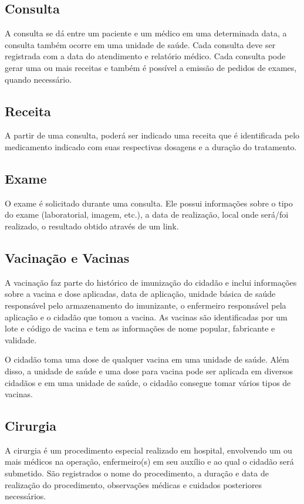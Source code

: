\documentclass[12pt, a4paper]{article}
\begin{document}
\subsection*{Consulta}
    A consulta se dá entre um paciente e um médico em uma determinada data, a
    consulta também ocorre em uma unidade de saúde. Cada consulta deve ser registrada
    com a data do atendimento e relatório médico. Cada consulta pode gerar uma ou mais
    receitas e também é possível a emissão de pedidos de exames, quando necessário.

\subsection*{Receita}
    A partir de uma consulta, poderá ser indicado uma receita que é identificada pelo
    medicamento indicado com suas respectivas dosagens e a duração do tratamento.

\subsection*{Exame}
    O exame é solicitado durante uma consulta. Ele possui informações sobre o tipo
    do exame (laboratorial, imagem, etc.), a data de realização, local onde será/foi realizado,
    o resultado obtido através de um link.

\subsection*{Vacinação e Vacinas}
    A vacinação faz parte do histórico de imunização do cidadão e inclui informações
    sobre a vacina e dose aplicadas, data de aplicação, unidade básica de saúde
    responsável pelo armazenamento do imunizante, o enfermeiro responsável pela aplicação
    e o cidadão que tomou a vacina. As vacinas são identificadas por um lote e código de
    vacina e tem as informações de nome popular, fabricante e validade.

    O cidadão toma uma dose de qualquer vacina em uma unidade de saúde. Além
    disso, a unidade de saúde e uma dose para vacina pode ser aplicada em diversos
    cidadãos e em uma unidade de saúde, o cidadão consegue tomar vários tipos de vacinas.

\subsection*{Cirurgia}
    A cirurgia é um procedimento especial realizado em hospital, envolvendo um ou
    mais médicos na operação, enfermeiro(s) em seu auxílio e ao qual o cidadão será
    submetido. São registrados o nome do procedimento, a duração e data de realização do
    procedimento, observações médicas e cuidados posteriores necessários.
\end{document}

